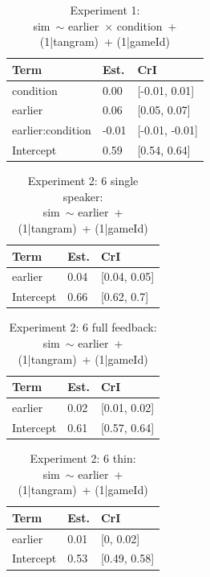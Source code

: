\documentclass[
  english,
  a4paper,
]{article}
\begin{document}
\begin{table}[h!]

\caption{\label{tab:unnamed-chunk-18}Experiment 1:\\ sim~$\sim$ earlier~$\times$ condition~+ (1|tangram)~+ (1|gameId)}
\centering
\begin{tabular}[t]{lll}
\toprule
Term & Est. & CrI\\
\midrule
condition & 0.00 & {}[-0.01, 0.01]\\
earlier & 0.06 & {}[0.05, 0.07]\\
earlier:condition & -0.01 & {}[-0.01, -0.01]\\
Intercept & 0.59 & {}[0.54, 0.64]\\
\bottomrule
\end{tabular}
\end{table}

\begin{table}[h!]

\caption{\label{tab:unnamed-chunk-18}Experiment 2: 6 single speaker:\\ sim~$\sim$ earlier~+ (1|tangram)~+ (1|gameId)}
\centering
\begin{tabular}[t]{lll}
\toprule
Term & Est. & CrI\\
\midrule
earlier & 0.04 & {}[0.04, 0.05]\\
Intercept & 0.66 & {}[0.62, 0.7]\\
\bottomrule
\end{tabular}
\end{table}

\begin{table}[h!]

\caption{\label{tab:unnamed-chunk-18}Experiment 2: 6 full feedback:\\ sim~$\sim$ earlier~+ (1|tangram)~+ (1|gameId)}
\centering
\begin{tabular}[t]{lll}
\toprule
Term & Est. & CrI\\
\midrule
earlier & 0.02 & {}[0.01, 0.02]\\
Intercept & 0.61 & {}[0.57, 0.64]\\
\bottomrule
\end{tabular}
\end{table}

\begin{table}[h!]

\caption{\label{tab:unnamed-chunk-18}Experiment 2: 6 thin:\\ sim~$\sim$ earlier~+ (1|tangram)~+ (1|gameId)}
\centering
\begin{tabular}[t]{lll}
\toprule
Term & Est. & CrI\\
\midrule
earlier & 0.01 & {}[0, 0.02]\\
Intercept & 0.53 & {}[0.49, 0.58]\\
\bottomrule
\end{tabular}
\end{table}
\end{document}
